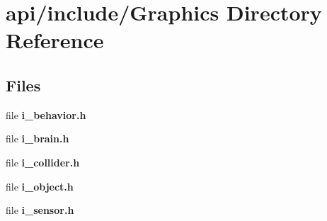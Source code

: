 \section{api/include/\+Graphics Directory Reference}
\label{dir_35d6c0084c09755d2f814e49b0149bac}
\subsection*{Files}
\begin{DoxyCompactItemize}
\item 
file {\bfseries i\+\_\+behavior.\+h}
\item 
file {\bfseries i\+\_\+brain.\+h}
\item 
file {\bfseries i\+\_\+collider.\+h}
\item 
file {\bfseries i\+\_\+object.\+h}
\item 
file {\bfseries i\+\_\+sensor.\+h}
\end{DoxyCompactItemize}
